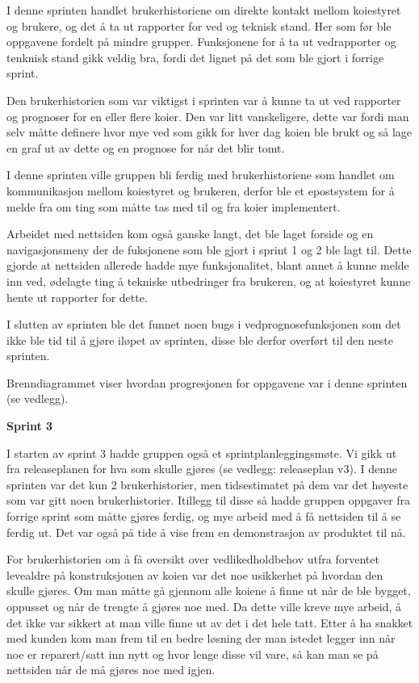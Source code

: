 \documentclass[12pt,a4paper,norsk]{article}
\begin{document}
I denne sprinten handlet brukerhistoriene om direkte kontakt mellom koiestyret og brukere, og det å ta ut rapporter for ved og teknisk stand. Her som før ble oppgavene fordelt på mindre grupper. Funksjonene for å ta ut vedrapporter og tenknisk stand gikk veldig bra, fordi det lignet på det som ble gjort i forrige sprint.

Den brukerhistorien som var viktigst i sprinten var å kunne ta ut ved rapporter og prognoser for en eller flere koier. Den var litt vanskeligere, dette var fordi man selv måtte definere hvor mye ved som gikk for hver dag koien ble brukt og så lage en graf ut av dette og en prognose for når det blir tomt. 

I denne sprinten ville gruppen bli ferdig med brukerhistoriene som handlet om kommunikasjon mellom koiestyret og brukeren, derfor ble et epostsystem for å melde fra om ting som måtte tas med til og fra koier implementert. 

Arbeidet med nettsiden kom også ganske langt, det ble laget forside og en navigasjonsmeny der de fuksjonene som ble gjort i sprint 1 og 2 ble lagt til. Dette gjorde at nettsiden allerede hadde mye funksjonalitet, blant annet å kunne melde inn ved, ødelagte ting å tekniske utbedringer fra brukeren, og at koiestyret kunne hente ut rapporter for dette. 

I slutten av sprinten ble det funnet noen bugs i vedprognosefunksjonen som det ikke ble tid til å gjøre iløpet av sprinten, disse ble derfor overført til den neste sprinten.

Brenndiagrammet viser hvordan progresjonen for oppgavene var i denne sprinten (se vedlegg).

\bigskip \noindent \textbf{Sprint 3}
\par I starten av sprint 3 hadde gruppen også et sprintplanleggingsmøte. Vi gikk ut fra releaseplanen for hva som skulle gjøres (se vedlegg: releaseplan v3). I denne sprinten var det kun 2 brukerhistorier, men tidsestimatet på dem var det høyeste som var gitt noen brukerhistorier. Itillegg til disse så hadde gruppen oppgaver fra forrige sprint som måtte gjøres ferdig, og mye arbeid med å få nettsiden til å se ferdig ut. Det var også på tide å vise frem en demonstrasjon av produktet til nå. 

For brukerhistorien om å få oversikt over vedlikedholdbehov utfra forventet levealdre på konstruksjonen av koien var det noe usikkerhet på hvordan den skulle gjøres. Om man måtte gå gjennom alle koiene å finne ut når de ble bygget, oppusset og når de trengte å gjøres noe med. Da dette ville kreve mye arbeid, å det ikke var sikkert at man ville finne ut av det i det hele tatt. Etter å ha snakket med kunden kom man frem til en bedre løsning der man istedet legger inn når noe er reparert/satt inn nytt og hvor lenge disse vil vare, så kan man se på nettsiden når de må gjøres noe med igjen. 
\end{document}
